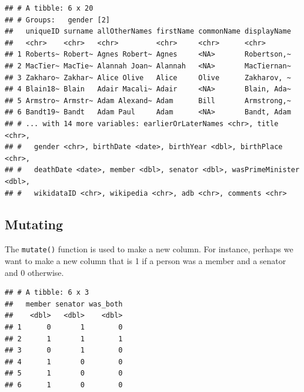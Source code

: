 \documentclass[
]{book}
\newenvironment{Shaded}{\begin{snugshade}}{\end{snugshade}}
\newcommand{\DataTypeTok}[1]{\textcolor[rgb]{0.13,0.29,0.53}{#1}}
\newcommand{\DecValTok}[1]{\textcolor[rgb]{0.00,0.00,0.81}{#1}}
\newcommand{\KeywordTok}[1]{\textcolor[rgb]{0.13,0.29,0.53}{\textbf{#1}}}
\newcommand{\NormalTok}[1]{#1}
\newcommand{\OperatorTok}[1]{\textcolor[rgb]{0.81,0.36,0.00}{\textbf{#1}}}
\newcommand{\StringTok}[1]{\textcolor[rgb]{0.31,0.60,0.02}{#1}}
\begin{document}
\begin{verbatim}
## # A tibble: 6 x 20
## # Groups:   gender [2]
##   uniqueID surname allOtherNames firstName commonName displayName
##   <chr>    <chr>   <chr>         <chr>     <chr>      <chr>      
## 1 Roberts~ Robert~ Agnes Robert~ Agnes     <NA>       Robertson,~
## 2 MacTier~ MacTie~ Alannah Joan~ Alannah   <NA>       MacTiernan~
## 3 Zakharo~ Zakhar~ Alice Olive   Alice     Olive      Zakharov, ~
## 4 Blain18~ Blain   Adair Macali~ Adair     <NA>       Blain, Ada~
## 5 Armstro~ Armstr~ Adam Alexand~ Adam      Bill       Armstrong,~
## 6 Bandt19~ Bandt   Adam Paul     Adam      <NA>       Bandt, Adam
## # ... with 14 more variables: earlierOrLaterNames <chr>, title <chr>,
## #   gender <chr>, birthDate <date>, birthYear <dbl>, birthPlace <chr>,
## #   deathDate <date>, member <dbl>, senator <dbl>, wasPrimeMinister <dbl>,
## #   wikidataID <chr>, wikipedia <chr>, adb <chr>, comments <chr>
\end{verbatim}

\hypertarget{mutating}{%
\subsection{Mutating}\label{mutating}}

The \texttt{mutate()} function is used to make a new column. For instance, perhaps we want to make a new column that is 1 if a person was a member and a senator and 0 otherwise.

\begin{Shaded}
\end{Shaded}

\begin{verbatim}
## # A tibble: 6 x 3
##   member senator was_both
##    <dbl>   <dbl>    <dbl>
## 1      0       1        0
## 2      1       1        1
## 3      0       1        0
## 4      1       0        0
## 5      1       0        0
## 6      1       0        0
\end{verbatim}
\end{document}
